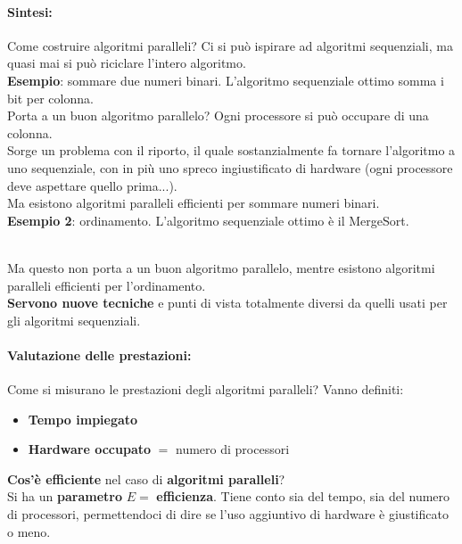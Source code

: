 \documentclass[11pt]{article}
\begin{document}
	\paragraph{Sintesi:} Come costruire algoritmi paralleli? Ci si può ispirare ad algoritmi sequenziali, ma quasi mai si può riciclare l'intero algoritmo.\\
	
	\textbf{Esempio}: sommare due numeri binari. L'algoritmo sequenziale ottimo somma i bit per colonna.\\
	
	Porta a un buon algoritmo parallelo? Ogni processore si può occupare di una colonna.\\
	Sorge un problema con il riporto, il quale sostanzialmente fa tornare l'algoritmo a uno sequenziale, con in più uno spreco ingiustificato di hardware (ogni processore deve aspettare quello prima...).\\
	Ma esistono algoritmi paralleli efficienti per sommare numeri binari.\\
	
	\textbf{Esempio 2}: ordinamento. L'algoritmo sequenziale ottimo è il MergeSort.\\\
	
	Ma questo non porta a un buon algoritmo parallelo, mentre esistono algoritmi paralleli efficienti per l'ordinamento.\\
	
	\textbf{Servono nuove tecniche} e punti di vista totalmente diversi da quelli usati per gli algoritmi sequenziali.\\
	
	\newpage
	
	\paragraph{Valutazione delle prestazioni:} Come si misurano le prestazioni degli algoritmi paralleli? Vanno definiti:
	\begin{itemize}
		\item \textbf{Tempo impiegato}
		\item \textbf{Hardware occupato} $=$ numero di processori
	\end{itemize}
	
	\textbf{Cos'è efficiente} nel caso di \textbf{algoritmi paralleli}?\\
	Si ha un \textbf{parametro} $E= $ \textbf{efficienza}. 	Tiene conto sia del tempo, sia del numero di processori, permettendoci di dire se l'uso aggiuntivo di hardware è giustificato o meno.\\
	
\end{document}
